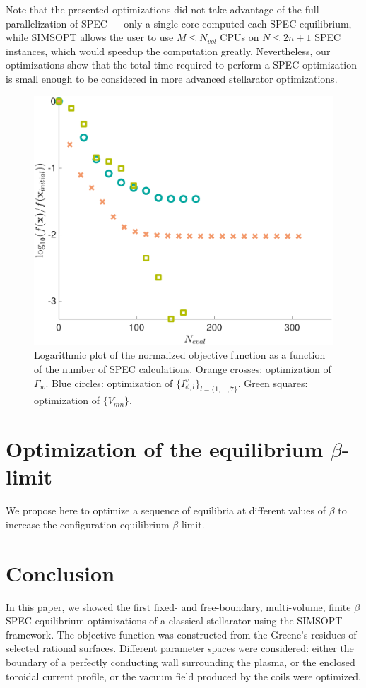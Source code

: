 \documentclass[my_thesis.tex]{subfiles}
\begin{document}
Note that the presented optimizations did not take advantage of the full parallelization of \ac{SPEC} --- only a single core computed each \ac{SPEC} equilibrium, while SIMSOPT allows the user to use $M\le N_{vol}$ \acp{CPU} on $N\le 2n+1$ \ac{SPEC} instances, which would speedup the computation greatly. Nevertheless, our optimizations show that the total time required to perform a SPEC optimization is small enough to be considered in more advanced stellarator optimizations.

\begin{figure}
    \centering
    \includegraphics[width=.45\textwidth]{main/Figures_Optimization/ObjectiveFunction.pdf}
    \caption{Logarithmic plot of the normalized objective function as a function of the number of \ac{SPEC} calculations. Orange crosses: optimization of $\Gamma_w$. Blue circles: optimization of $\{I^v_{\phi,l}\}_{l=\{1,\ldots,7\}}$. Green squares: optimization of $\{V_{mn}\}$.}
    \label{fig:objective_function}
\end{figure}




\section{Optimization of the equilibrium $\beta$-limit}

We propose here to optimize a sequence of equilibria at different values of $\beta$ to increase the configuration equilibrium $\beta$-limit. 



\section{Conclusion}

In this paper, we showed the first fixed- and free-boundary, multi-volume, finite $\beta$ \ac{SPEC} equilibrium optimizations of a classical stellarator using the SIMSOPT framework. The objective function was constructed from the Greene's residues of selected rational surfaces. Different parameter spaces were considered: either the boundary of a perfectly conducting wall surrounding the plasma, or the enclosed toroidal current profile, or the vacuum field produced by the coils were optimized. 
\end{document}

